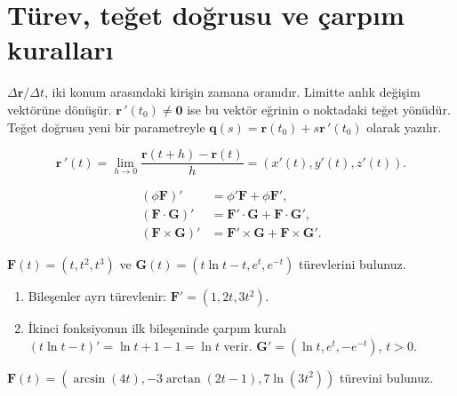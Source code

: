 \section{Türev, teğet doğrusu ve çarpım kuralları}
\(\Delta\mathbf r/\Delta t\), iki konum arasındaki kirişin zamana oranıdır. Limitte anlık değişim vektörüne dönüşür. \(\mathbf r\,\prime(t_0)\ne\mathbf0\) ise bu vektör eğrinin o noktadaki teğet yönüdür. Teğet doğrusu yeni bir parametreyle \(\mathbf q(s)=\mathbf r(t_0)+s\mathbf r\,\prime(t_0)\) olarak yazılır.


{\small\[
\mathbf r\,\prime(t)=\lim_{h\to0}\frac{\mathbf r(t+h)-\mathbf r(t)}h=(x\prime(t),y\prime(t),z\prime(t)).
\]}

{\small\[
\begin{aligned}(\phi\mathbf F)\prime&=\phi\prime\mathbf F+\phi\mathbf F\prime,\\(\mathbf F\cdot\mathbf G)\prime&=\mathbf F\prime\cdot\mathbf G+\mathbf F\cdot\mathbf G\prime,\\(\mathbf F\times\mathbf G)\prime&=\mathbf F\prime\times\mathbf G+\mathbf F\times\mathbf G\prime.\end{aligned}
\]}
\begin{tcolorbox}[title={Örnek 3.7 | Dersteki temel türevler},colframe=accent]\(\mathbf F(t)=(t,t^2,t^3)\) ve \(\mathbf G(t)=(t\ln t-t,e^t,e^{-t})\) türevlerini bulunuz.
\par{}\end{tcolorbox}
\begin{tcolorbox}[title={Adım adım çözüm},colback=green!3!white,colframe=green]\begin{enumerate}
\item Bileşenler ayrı türevlenir: \(\mathbf F\prime=(1,2t,3t^2)\).
\item İkinci fonksiyonun ilk bileşeninde çarpım kuralı \((t\ln t-t)\prime=\ln t+1-1=\ln t\) verir. \(\mathbf G\prime=(\ln t,e^t,-e^{-t})\), \(t>0\).
\end{enumerate}\end{tcolorbox}
\begin{tcolorbox}[title={Örnek 3.8 | Zincir kuralı içeren vektör türevi},colframe=accent]\(\mathbf F(t)=(\arcsin(4t),-3\arctan(2t-1),7\ln(3t^2))\) türevini bulunuz.
\par{}\end{tcolorbox}

